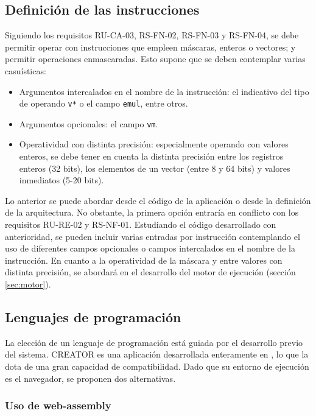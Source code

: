 \subsection{Definición de las instrucciones}\label{subsec:defi-ins}

Siguiendo los requisitos RU-CA-03, RS-FN-02, RS-FN-03 y RS-FN-04, se debe permitir operar con instrucciones que empleen máscaras, enteros o vectores; y permitir operaciones enmascaradas. Esto supone que se deben contemplar varias casuísticas:

\begin{itemize}
\item Argumentos intercalados en el nombre de la instrucción: el indicativo del tipo de operando \texttt{v*} o el campo \texttt{emul}, entre otros.
\item Argumentos opcionales: el campo \texttt{vm}.
\item Operatividad con distinta precisión: especialmente operando con valores enteros, se debe tener en cuenta la distinta precisión entre los registros enteros (32 bits), los elementos de un vector (entre 8 y 64 bits) y valores inmediatos (5-20 bits).
\end{itemize}

Lo anterior se puede abordar desde el código de la aplicación o desde la definición de la arquitectura. No obstante, la primera opción entraría en conflicto con los requisitos RU-RE-02 y RS-NF-01. Estudiando el código desarrollado con anterioridad, se pueden incluir varias entradas por instrucción contemplando el uso de diferentes campos opcionales o campos intercalados en el nombre de la instrucción. En cuanto a la operatividad de la máscara y entre valores con distinta precisión, se abordará en el desarrollo del motor de ejecución (sección \ref{sec:motor}).

\subsection{Lenguajes de programación}{\label{subsec:programming-languages}}
La elección de un lenguaje de programación está guiada por el desarrollo previo
del sistema. CREATOR es una aplicación desarrollada enteramente en
\js, lo que la dota de una gran capacidad de
compatibilidad. Dado que su entorno de ejecución es el navegador, se proponen
dos alternativas.

\subsubsection{Uso de web-assembly}


